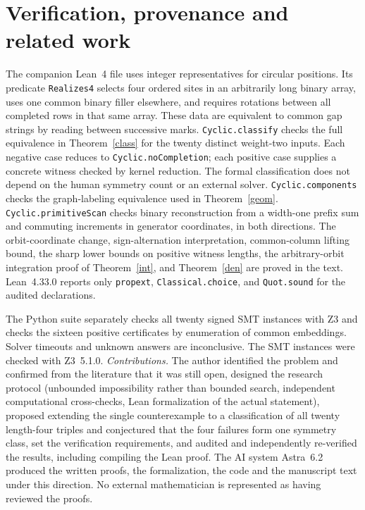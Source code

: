 \documentclass[11pt]{article}
\begin{document}
\section{Verification, provenance and related work}
The companion Lean~4 file uses integer representatives for circular positions. Its predicate \texttt{Realizes4} selects four ordered sites in an arbitrarily long binary array, uses one common binary filler elsewhere, and requires rotations between all completed rows in that same array. These data are equivalent to common gap strings by reading between successive marks. \texttt{Cyclic.classify} checks the full equivalence in Theorem~\ref{class} for the twenty distinct weight-two inputs. Each negative case reduces to \texttt{Cyclic.noCompletion}; each positive case supplies a concrete witness checked by kernel reduction. The formal classification does not depend on the human symmetry count or an external solver. \texttt{Cyclic.components} checks the graph-labeling equivalence used in Theorem~\ref{geom}. \texttt{Cyclic.primitiveScan} checks binary reconstruction from a width-one prefix sum and commuting increments in generator coordinates, in both directions. The orbit-coordinate change, sign-alternation interpretation, common-column lifting bound, the sharp lower bounds on positive witness lengths, the arbitrary-orbit integration proof of Theorem~\ref{int}, and Theorem~\ref{den} are proved in the text. Lean~4.33.0 reports only \texttt{propext}, \texttt{Classical.choice}, and \texttt{Quot.sound} for the audited declarations.

The Python suite separately checks all twenty signed SMT instances with Z3 and checks the sixteen positive certificates by enumeration of common embeddings. Solver timeouts and unknown answers are inconclusive. The SMT instances were checked with Z3~5.1.0. \emph{Contributions.} The author identified the problem and confirmed from the literature that it was still open, designed the research protocol (unbounded impossibility rather than bounded search, independent computational cross-checks, Lean formalization of the actual statement), proposed extending the single counterexample to a classification of all twenty length-four triples and conjectured that the four failures form one symmetry class, set the verification requirements, and audited and independently re-verified the results, including compiling the Lean proof. The AI system Astra~6.2 produced the written proofs, the formalization, the code and the manuscript text under this direction. No external mathematician is represented as having reviewed the proofs.
\end{document}

